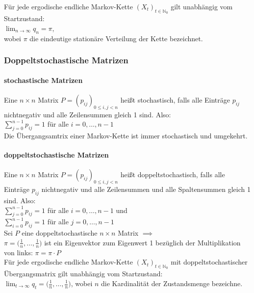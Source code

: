 \documentclass[a4paper,9pt]{extarticle}
\begin{document}
Für jede ergodische endliche Markov-Kette $(X_t)_{t \in \mathbb{N}_0}$ gilt unabhängig vom Startzustand: \\
$\lim_{n → ∞} q_n = \pi$, \\
wobei $\pi$ die eindeutige stationäre Verteilung der Kette bezeichnet.

\subsubsection*{Doppeltstochastische Matrizen}
\paragraph*{stochastische Matrizen}
Eine $n \times n$ Matrix $P = (p_{ij})_{0 ≤ i,j < n}$ heißt stochastisch, falls alle Einträge $p_{ij}$ nichtnegativ und alle Zeilensummen gleich 1 sind. Also: \\
$\sum_{j = 0}^{n - 1} p_{ij} = 1$ für alle $i = 0, \dots, n - 1$ \\

Die Übergangsamtrix einer Markov-Kette ist immer stochastisch und umgekehrt.

\paragraph*{doppeltstochastische Matrizen}
Eine $n \times n$ Matrix $P = (p_{ij})_{0 ≤ i,j < n}$ heißt doppeltstochastisch, falls alle Einträge $p_{ij}$ nichtnegativ und alle Zeilensummen und alle Spaltensummen gleich 1 sind. Also: \\
$\sum_{j = 0}^{n - 1} p_{ij} = 1$ für alle $i = 0, \dots, n - 1$ und \\
$\sum_{i = 0}^{n - 1} p_{ij} = 1$ für alle $j= 0, \dots, n - 1$ \\

Sei $P$ eine doppeltstochastische $n \times n$ Matrix $\implies$ \\
$\pi = \Big(\frac 1 n, \dots, \frac 1 n \Big)$ ist ein Eigenvektor zum Eigenwert 1 bezüglich der Multiplikation von links: $\pi = \pi ⋅ P$ \\

Für jede ergodische endliche Markov-Kette $(X_t)_{t \in \mathbb{N}_0}$ mit doppeltstochastischer Übergangsmatrix gilt unabhängig vom Startzustand: \\
$\lim_{t → ∞} q_t = \Big(\frac 1 n, \dots, \frac 1 n\Big)$, wobei $n$ die Kardinalität der Zustandsmenge bezeichne.
\end{document}
